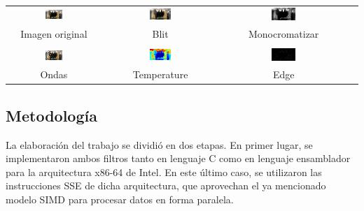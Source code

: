 \begin{center}
 \begin{tabular}{cccc}
   \includegraphics[width=0.2\textwidth]{imagenes/island.png} &
   \includegraphics[width=0.2\textwidth]{imagenes/island-blit.png} &
   \includegraphics[width=0.2\textwidth]{imagenes/island-monocromatizar.png} \\
   Imagen original & Blit & Monocromatizar \\
   \\
   \includegraphics[width=0.2\textwidth]{imagenes/island-ondas.png} &
   \includegraphics[width=0.2\textwidth]{imagenes/island-temperature.png} &
   \includegraphics[width=0.2\textwidth]{imagenes/island-edge.png} \\
   Ondas & Temperature & Edge \\
 \end{tabular}
\end{center}

\subsection{Metodología}
La elaboración del trabajo se dividió en dos etapas. En primer lugar, se implementaron ambos filtros tanto en lenguaje C como en lenguaje ensamblador para la arquitectura x86-64 de Intel. En este último caso, se utilizaron las instrucciones SSE de dicha arquitectura, que aprovechan el ya mencionado modelo SIMD para procesar datos en forma paralela.


